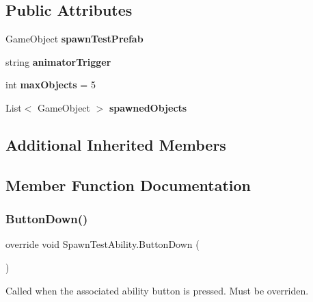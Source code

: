 \subsection*{Public Attributes}
\begin{DoxyCompactItemize}
\item 
\hypertarget{class_spawn_test_ability_a8350f8de9d123317d8ff5ef694245cda}{}\label{class_spawn_test_ability_a8350f8de9d123317d8ff5ef694245cda} 
Game\+Object {\bfseries spawn\+Test\+Prefab}
\item 
\hypertarget{class_spawn_test_ability_a7c9b9004e07b801f85391a8c86943b03}{}\label{class_spawn_test_ability_a7c9b9004e07b801f85391a8c86943b03} 
string {\bfseries animator\+Trigger}
\item 
\hypertarget{class_spawn_test_ability_aaaf60835dd4199fa983b4a03cab4f504}{}\label{class_spawn_test_ability_aaaf60835dd4199fa983b4a03cab4f504} 
int {\bfseries max\+Objects} = 5
\item 
\hypertarget{class_spawn_test_ability_ae46a5ea71cf118425f5056036e32e3d8}{}\label{class_spawn_test_ability_ae46a5ea71cf118425f5056036e32e3d8} 
List$<$ Game\+Object $>$ {\bfseries spawned\+Objects}
\end{DoxyCompactItemize}
\subsection*{Additional Inherited Members}


\subsection{Member Function Documentation}
\hypertarget{class_spawn_test_ability_ab6b09e46c9915a7980ac533a7162ea48}{}\label{class_spawn_test_ability_ab6b09e46c9915a7980ac533a7162ea48} 
\subsubsection{\texorpdfstring{Button\+Down()}{ButtonDown()}}
{\footnotesize\ttfamily override void Spawn\+Test\+Ability.\+Button\+Down (\begin{DoxyParamCaption}{ }\end{DoxyParamCaption})\hspace{0.3cm}{\ttfamily [virtual]}}



Called when the associated ability button is pressed. Must be overriden. 



